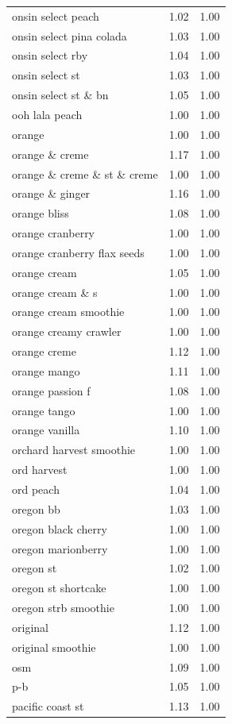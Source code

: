 \begin{table}
\begin{tabular}{lrr}
onsin select peach & 1.02 & 1.00 \\
onsin select pina colada & 1.03 & 1.00 \\
onsin select rby & 1.04 & 1.00 \\
onsin select st & 1.03 & 1.00 \\
onsin select st \& bn & 1.05 & 1.00 \\
ooh lala peach & 1.00 & 1.00 \\
orange & 1.00 & 1.00 \\
orange \& creme & 1.17 & 1.00 \\
orange \& creme \& st \& creme & 1.00 & 1.00 \\
orange \& ginger & 1.16 & 1.00 \\
orange bliss & 1.08 & 1.00 \\
orange cranberry & 1.00 & 1.00 \\
orange cranberry flax seeds & 1.00 & 1.00 \\
orange cream & 1.05 & 1.00 \\
orange cream \& s & 1.00 & 1.00 \\
orange cream smoothie & 1.00 & 1.00 \\
orange creamy crawler & 1.00 & 1.00 \\
orange creme & 1.12 & 1.00 \\
orange mango & 1.11 & 1.00 \\
orange passion f & 1.08 & 1.00 \\
orange tango & 1.00 & 1.00 \\
orange vanilla & 1.10 & 1.00 \\
orchard harvest smoothie & 1.00 & 1.00 \\
ord harvest & 1.00 & 1.00 \\
ord peach & 1.04 & 1.00 \\
oregon bb & 1.03 & 1.00 \\
oregon black cherry & 1.00 & 1.00 \\
oregon marionberry & 1.00 & 1.00 \\
oregon st & 1.02 & 1.00 \\
oregon st shortcake & 1.00 & 1.00 \\
oregon strb smoothie & 1.00 & 1.00 \\
original & 1.12 & 1.00 \\
original smoothie & 1.00 & 1.00 \\
osm & 1.09 & 1.00 \\
p-b & 1.05 & 1.00 \\
pacific coast st & 1.13 & 1.00 \\

\end{tabular}
\end{table}
